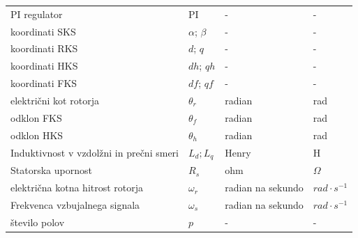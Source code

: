 \documentclass[a4paper,twoside,openright,12pt,slovene]{book}
\begin{document}
\begin{center}
\begin{tabular}{*{4}{l}}
        PI regulator                                               & PI                                     & -                    & -                      \\                                                    
        koordinati SKS                                             & $\alpha$; $\beta$                      & -                    & -                      \\
        koordinati RKS                                             & $d$; $q$                               & -                    & -                      \\
        koordinati HKS                                             & $dh$; $qh$                             & -                    & -                      \\
        koordinati FKS                                             & $df$; $qf$                             & -                    & -                      \\
        električni kot rotorja                                     & $\theta_{r}$                           & radian               & rad                    \\
        odklon FKS                                                 & $\theta_{f}$                           & radian               & rad                    \\
        odklon HKS                                                 & $\theta_{h}$                           & radian               & rad                    \\
        Induktivnost v vzdolžni in prečni smeri                    & $L_d; L_q$                             & Henry                & H                      \\
        Statorska upornost                                         & $R_s$                                  & ohm                  & $\Omega$               \\
        električna kotna hitrost rotorja                           & $\omega_r$                             & radian na sekundo    & $rad \cdot s^{-1}$     \\
        Frekvenca vzbujalnega signala                              & $\omega_{s}$                           & radian na sekundo    & $rad \cdot s^{-1}$     \\
        število polov                                              & $p$                                    & -                    & -                      \\

\end{tabular}
\end{center}
\end{document}
